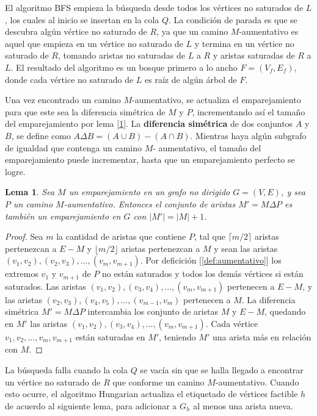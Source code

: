 \documentclass[10pt]{article} %
\newtheorem{lem}{Lema}
\begin{document}
El algoritmo BFS empieza la b\'usqueda desde todos los v\'ertices no saturados de $L$, los cuales al inicio se insertan en la cola $Q$. La condici\'on de parada es que se descubra alg\'un v\'ertice no saturado de $R$, ya que un camino $M$-aumentativo es aquel que empieza en un v\'ertice no saturado de $L$ y termina en un v\'ertice no saturado de $R$, tomando aristas no saturadas de $L$ a $R$ y aristas saturadas de $R$ a $L$. El resultado del algoritmo es un bosque primero a lo ancho $F = (V_f, E_f)$, donde cada v\'ertice no saturado de $L$ es ra\'iz de alg\'un \'arbol de $F$.

Una vez encontrado un camino $M$-aumentativo, se actualiza el emparejamiento para que este sea la diferencia sim\'etrica de $M$ y $P$, incrementando as\'i el tama\~no del emparejamiento por lema [\ref{lm:ds}]. La \textbf{diferencia sim\'etrica} de dos conjuntos $A$ y $B$, se define como $A \Delta B = (A \cup B) - (A \cap B)$. Mientras haya alg\'un subgrafo de igualdad que contenga un camino $M$- aumentativo, el tama\~no del emparejamiento puede incrementar, hasta que un emparejamiento perfecto se logre.

\begin{lem}\cite{introduction}
	\label{lm:ds}
	Sea $M$ un emparejamiento en un grafo no dirigido $G=(V,E)$, y sea $P$ un camino $M$-aumentativo. Entonces el conjunto de aristas $M' = M \Delta P$ es tambi\'en un emparejamiento en $G$ con $|M'| = |M| + 1$.
\end{lem}

\begin{proof}
	Sea $m$ la cantidad de aristas que contiene $P$, tal que $\lceil m/2 \rceil$ aristas pertenezcan a $E-M$ y $\lfloor m/2 \rfloor$ aristas pertenezcan a $M$ y sean las aristas $(v_1,v_2),(v_2,v_3),...,(v_m,v_{m+1})$. Por deficici\'on [\ref{def:aumentativo}] los extremos $v_1$ y $v_{m+1}$ de $P$  no est\'an saturados y todos los dem\'as v\'ertices si est\'an saturados. Las aristas $(v_1,v_2),(v_3,v_4),...,(v_m,v_{m+1})$ pertenecen a $E-M$, y las aristas $(v_2,v_3), (v_4,v_5),...,(v_{m-1},v_m)$ pertenecen a $M$. La diferencia sim\'etrica $M'=M \Delta P$ intercambia los conjunto de aristas $M$ y $E-M$, quedando en $M'$ las aristas $(v_1,v_2),(v_3,v_4),...,(v_m,v_{m+1})$. Cada v\'ertice $v_1,v_2,...,v_m,v_{m+1}$ est\'an saturadas en $M'$, teniendo $M'$ una arista m\'as en relaci\'on con $M$.
\end{proof}
La b\'usqueda falla cuando  la cola $Q$ se vac\'ia sin que se halla llegado a encontrar un v\'ertice no saturado de $R$ que conforme un camino $M$-aumentativo. Cuando esto ocurre, el algoritmo Hungarian actualiza el etiquetado de v\'ertices factible $h$ de acuerdo al siguiente lema, para adicionar a $G_h$ al menos una arista nueva.
\end{document}
